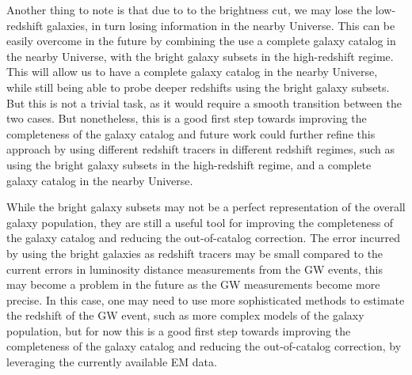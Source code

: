 Another thing to note is that due to to the brightness cut, we may lose the low-redshift galaxies, in turn losing information in the nearby Universe. This can be easily overcome in the future by combining the use a complete galaxy catalog in the nearby Universe, with the bright galaxy subsets in the high-redshift regime. This will allow us to have a complete galaxy catalog in the nearby Universe, while still being able to probe deeper redshifts using the bright galaxy subsets. But this is not a trivial task, as it would require a smooth transition between the two cases. But nonetheless, this is a good first step towards improving the completeness of the galaxy catalog and future work could further refine this approach by using different redshift tracers in different redshift regimes, such as using the bright galaxy subsets in the high-redshift regime, and a complete galaxy catalog in the nearby Universe.

While the bright galaxy subsets may not be a perfect representation of the overall galaxy population, they are still a useful tool for improving the completeness of the galaxy catalog and reducing the out-of-catalog correction. The error incurred by using the bright galaxies as redshift tracers may be small compared to the current errors in luminosity distance measurements from the \ac{GW} events, this may become a problem in the future as the \ac{GW} measurements become more precise. In this case, one may need to use more sophisticated methods to estimate the redshift of the \ac{GW} event, such as more complex models of the galaxy population, but for now this is a good first step towards improving the completeness of the galaxy catalog and reducing the out-of-catalog correction, by leveraging the currently available \ac{EM} data.


